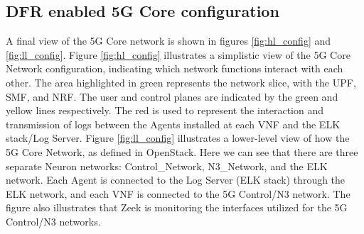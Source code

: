 \documentclass[final,1p,times,authoryear]{elsarticle}
\begin{document}
\subsection{DFR enabled 5G Core configuration}
\label{sub3sec7}
A final view of the 5G Core network is shown in figures \ref{fig:hl_config} and \ref{fig:ll_config}. Figure \ref{fig:hl_config} illustrates a simplistic view of the 5G Core Network configuration, indicating which network functions interact with each other. The area highlighted in green represents the network slice, with the UPF, SMF, and NRF. The user and control planes are indicated by the green and yellow lines respectively. The red is used to represent the interaction and transmission of logs between the Agents installed at each VNF and the ELK stack/Log Server. Figure \ref{fig:ll_config} illustrates a lower-level view of how the 5G Core Network, as defined in OpenStack. Here we can see that there are three separate Neuron networks: Control\_Network, N3\_Network, and the ELK network. Each Agent is connected to the Log Server (ELK stack) through the ELK network, and each VNF is connected to the 5G Control/N3 network. The figure also illustrates that Zeek is monitoring the interfaces utilized for the 5G Control/N3 networks.
\end{document}
